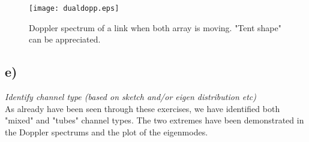 \begin{figure}[!h]
  \centering
  \texttt{[image: dualdopp.eps]}
  \caption{Doppler spectrum of a link when both array is moving. "Tent shape" can be appreciated.}
  \label{fig:dualdopp}
\end{figure}

\subsection{e)}
\textit{Identify channel type (based on sketch and/or eigen distribution etc)}\\

As already have been seen through these exercises, we have identified both "mixed" and "tubes" channel types. The two extremes have been demonstrated in the Doppler spectrums and the plot of the eigenmodes.